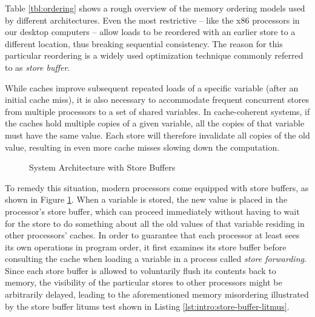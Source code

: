 Table \ref{tbl:ordering} shows a rough overview of the memory ordering models used by different architectures.
Even the most restrictive -- like the x86 processors in our desktop computers -- allow loads to be reordered with an earlier store to a different location, thus breaking sequential consistency.
The reason for this particular reordering is a widely used optimization technique commonly referred to as \emph{store buffer}.

While caches improve subsequent repeated loads of a specific variable (after an initial cache miss),
it is also necessary to accommodate frequent concurrent stores from multiple processors to a set of shared variables.
In cache-coherent systems, if the caches hold multiple copies of a given variable, all the copies of that variable must have the same value.
Each store will therefore invalidate all copies of the old value, resulting in even more cache misses slowing down the computation. %


\begin{figure}[!h]
  \centering
  
  \caption{System Architecture with Store Buffers}
  \label{fig:intro:store-buffer-architecture}
\end{figure}

To remedy this situation, modern processors come equipped with store buffers, as shown in Figure \ref{fig:intro:store-buffer-architecture}.
When a variable is stored, the new value is placed in the processor's store buffer, which can proceed immediately without having to wait for the store to do something about all the old values of that variable residing in other processors' caches.
In order to guarantee that each processor at least sees its own operations in program order, it first examines its store buffer before consulting the cache when loading a variable in a process called \emph{store forwarding}.
Since each store buffer is allowed to voluntarily flush its contents back to memory, the visibility of the particular stores to other processors might be arbitrarily delayed, leading to the aforementioned memory misordering
illustrated by the store buffer litums test shown in Listing \ref{lst:intro:store-buffer-litmus}.

